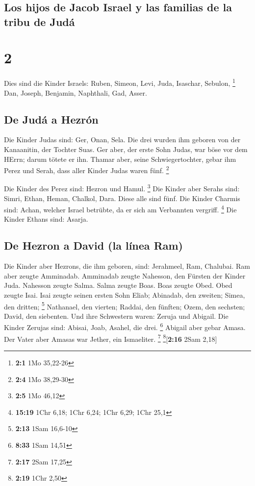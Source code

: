 \hypertarget{los-hijos-de-jacob-israel-y-las-familias-de-la-tribu-de-juduxe1}{%
\subsection{Los hijos de Jacob Israel y las familias de la tribu de
Judá}\label{los-hijos-de-jacob-israel-y-las-familias-de-la-tribu-de-juduxe1}}

\hypertarget{section-1}{%
\section{2}\label{section-1}}

 Dies sind die Kinder Israels: Ruben, Simeon, Levi, Juda,
Isaschar, Sebulon, \footnote{\textbf{2:1} 1Mo 35,22-26} 
Dan, Joseph, Benjamin, Naphthali, Gad, Asser.

\hypertarget{de-juduxe1-a-hezruxf3n}{%
\subsection{De Judá a Hezrón}\label{de-juduxe1-a-hezruxf3n}}

 Die Kinder Judas sind: Ger, Onan, Sela. Die drei wurden
ihm geboren von der Kanaanitin, der Tochter Suas. Ger aber, der erste
Sohn Judas, war böse vor dem HErrn; darum tötete er ihn. 
Thamar aber, seine Schwiegertochter, gebar ihm Perez und Serah, dass
aller Kinder Judas waren fünf. \footnote{\textbf{2:4} 1Mo 38,29-30}

 Die Kinder des Perez sind: Hezron und Hamul. \footnote{\textbf{2:5}
  1Mo 46,12}  Die Kinder aber Serahs sind: Simri, Ethan,
Heman, Chalkol, Dara. Diese alle sind fünf.  Die Kinder
Charmis sind: Achan, welcher Israel betrübte, da er sich am Verbannten
vergriff. \footnote{\textbf{15:19} 1Chr 6,18; 1Chr 6,24; 1Chr 6,29; 1Chr
  25,1}  Die Kinder Ethans sind: Asarja.

\hypertarget{de-hezron-a-david-la-luxednea-ram}{%
\subsection{De Hezron a David (la línea
Ram)}\label{de-hezron-a-david-la-luxednea-ram}}

 Die Kinder aber Hezrons, die ihm geboren, sind:
Jerahmeel, Ram, Chalubai.  Ram aber zeugte Amminadab.
Amminadab zeugte Nahesson, den Fürsten der Kinder Juda. 
Nahesson zeugte Salma. Salma zeugte Boas.  Boas zeugte
Obed. Obed zeugte Isai.  Isai zeugte seinen ersten Sohn
Eliab; Abinadab, den zweiten; Simea, den dritten; \footnote{\textbf{2:13}
  1Sam 16,6-10}  Nathanael, den vierten; Raddai, den
fünften;  Ozem, den sechsten; David, den siebenten.
 Und ihre Schwestern waren: Zeruja und Abigail. Die
Kinder Zerujas sind: Abisai, Joab, Asahel, die drei. \footnote{\textbf{8:33}
  1Sam 14,51}  Abigail aber gebar Amasa. Der Vater aber
Amasas war Jether, ein Ismaeliter. \footnote{\textbf{2:17} 2Sam 17,25}
\footnote{\textbf{2:19} 1Chr 2,50}{[}\textbf{2:16} 2Sam 2,18{]}

